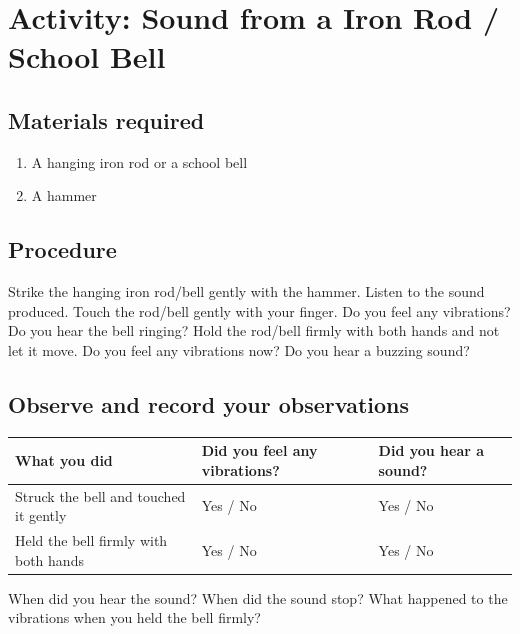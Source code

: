 \section{Activity: Sound from a Iron Rod / School Bell}
\subsection{Materials required}
\begin{enumerate}
\item A hanging iron rod or a school bell
\item A hammer
\end{enumerate}
\subsection{Procedure}
Strike the hanging iron rod/bell gently with the hammer. Listen to the sound produced. Touch the rod/bell gently with your finger. Do you feel any vibrations? Do you hear the bell ringing? Hold the rod/bell firmly with both hands and not let it move. Do you feel any vibrations now? Do you hear a buzzing sound?
\begin{marginfigure}
  \caption{Image or illustration of a school bell or iron rod}
\end{marginfigure}
\subsection{Observe and record your observations}
\begin{fullwidth}
\begin{table}[h]
  \centering
  \begin{tabular}{lll}
    \toprule
    What you did & Did you feel any vibrations? & Did you hear a sound? \\
    \midrule
    Struck the bell and touched it gently & Yes / No &  Yes / No \\
    Held the bell firmly with both hands     & Yes / No &  Yes / No \\
    \bottomrule
  \end{tabular}
\end{table}
\end{fullwidth}

 When did you hear the sound? When did the sound stop? What happened to the vibrations when you held the bell firmly?